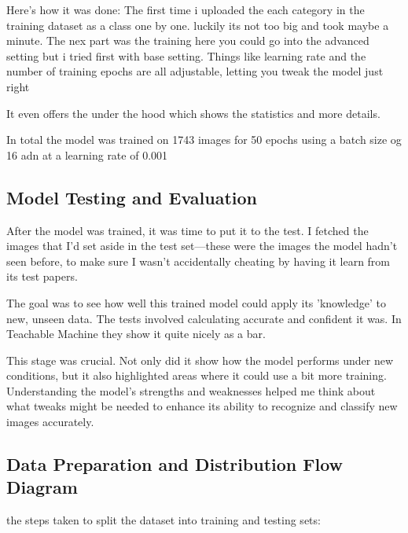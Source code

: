 Here's how it was done: 
The first time i uploaded the each category in the training dataset as a class one by one. luckily its not too big and took maybe a minute. 
The nex part was the training here you could go into the advanced setting but i tried first with base setting. Things like learning rate and the number of training epochs are all adjustable, letting you tweak the model just right

It even offers the under the hood which shows the statistics and more details.

In total the model was trained on 1743 images for 50 epochs using a batch size og 16 adn at a learning rate of 0.001
\subsection{Model Testing and Evaluation}
After the model was trained, it was time to put it to the test. I fetched the images that I'd set aside in the test set—these were the images the model hadn't seen before, to make sure I wasn't accidentally cheating by having it learn from its test papers.

The goal was to see how well this trained model could apply its 'knowledge' to new, unseen data. The tests involved calculating accurate and confident it was. In Teachable Machine they show it quite nicely as a bar. 

This stage was crucial. Not only did it show how the model performs under new conditions, but it also highlighted areas where it could use a bit more training. Understanding the model's strengths and weaknesses helped me think about what tweaks might be needed to enhance its ability to recognize and classify new images accurately. 

\subsection{Data Preparation and Distribution Flow Diagram}
the steps taken to split the dataset into training and testing sets:

